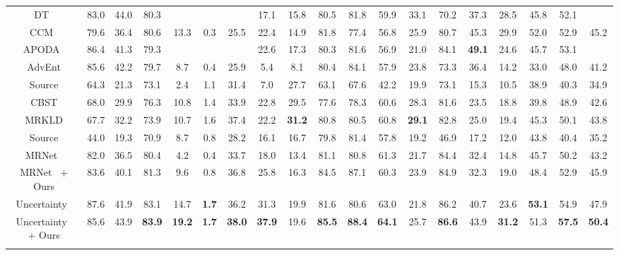\documentclass[journal]{IEEEtran}
\begin{document}
\begin{table*}[!t]
{\begin{tabular}{c|cccccccccccccccc|c|c}
		DT~\cite{wang2020differential} & 83.0 & 44.0 & 80.3 &  &  &  & 17.1 & 15.8 & 80.5 & 81.8 & 59.9 & 33.1 & 70.2 & 37.3 & 28.5 & 45.8 & 52.1 &   \\
		CCM~\cite{li2020content} & 79.6 & 36.4 & 80.6 & 13.3 & 0.3 & 25.5 & 22.4 & 14.9 & 81.8 & 77.4 & 56.8 & 25.9 & 80.7 & 45.3 & 29.9 &  52.0 & 52.9 & 45.2 \\
		APODA~\cite{yang2020adversarial} & 86.4 & 41.3 & 79.3 &  &  &  & 22.6 & 17.3 & 80.3 & 81.6 & 56.9 & 21.0 & 84.1 & \textbf{49.1} & 24.6 & 45.7 & 53.1 &   \\
		\hline
		AdvEnt \cite{vu2019advent} & 85.6 & 42.2 & 79.7 & 8.7 & 0.4 & 25.9 & 5.4 & 8.1 & 80.4 & 84.1 & 57.9 & 23.8 & 73.3 & 36.4 & 14.2 & 33.0 & 48.0 & 41.2 \\
		\hline
		Source & 64.3 & 21.3 & 73.1 & 2.4 & 1.1 & 31.4 & 7.0 & 27.7 & 63.1 & 67.6 & 42.2 & 19.9 & 73.1 & 15.3 & 10.5 & 38.9 & 40.3 & 34.9 \\
		CBST \cite{zou2018unsupervised} & 68.0 & 29.9 & 76.3 & 10.8 & 1.4 & 33.9 & 22.8 & 29.5 & 77.6 & 78.3 & 60.6 & 28.3 & 81.6 & 23.5 & 18.8 & 39.8 & 48.9 & 42.6 \\
		MRKLD \cite{zou2019confidence} & 67.7 & 32.2 & 73.9 & 10.7 & 1.6 & 37.4 & 22.2 & \textbf{31.2} & 80.8 & 80.5 & 60.8 & \textbf{29.1} & 82.8 & 25.0 & 19.4 & 45.3 & 50.1 & 43.8 \\
		\hline
Source & 44.0 & 19.3 & 70.9 & 8.7 & 0.8 & 28.2 & 16.1 & 16.7 & 79.8 & 81.4 & 57.8 & 19.2 & 46.9 & 17.2 & 12.0 & 43.8 & 40.4 & 35.2 \\
		MRNet~\cite{zheng2019unsupervised} & 82.0 & 36.5 & 80.4 & 4.2 & 0.4 & 33.7 & 18.0 & 13.4 & 81.1 & 80.8 & 61.3 & 21.7 & 84.4 & 32.4 & 14.8 & 45.7 & 50.2 & 43.2 \\
		\rowcolor{lightgray} 
		MRNet~\cite{zheng2019unsupervised} + Ours & 83.6 & 40.1 & 81.3 & 9.6 & 0.8 & 36.8 & 25.8 & 16.3 & 84.5 & 87.1 & 60.3 & 23.9 & 84.9 & 32.3 & 19.0 & 48.4 & 52.9 & 45.9 \\
Uncertainty~\cite{zheng2020unsupervised} & 87.6 & 41.9 & 83.1 & 14.7 & \textbf{1.7} & 36.2 & 31.3 & 19.9 & 81.6 & 80.6 & 63.0 & 21.8 & 86.2 & 40.7 & 23.6 & \textbf{53.1} & 54.9 & 47.9 
		\\
		\rowcolor{lightgray} 
		Uncertainty~\cite{zheng2020unsupervised} + Ours & 85.6 & 43.9 & \textbf{83.9} & \textbf{19.2} & \textbf{1.7} & \textbf{38.0} & \textbf{37.9} & 19.6 & \textbf{85.5} & \textbf{88.4} & \textbf{64.1} & 25.7 & \textbf{86.6} & 43.9 & \textbf{31.2} & 51.3 & \textbf{57.5} & \textbf{50.4} \\
		\shline
	\end{tabular}
	}
\end{table*}
\end{document}
